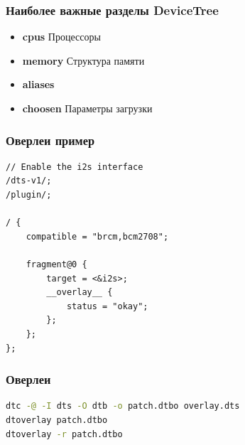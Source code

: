 \begin{frame}
  \frametitle{Наиболее важные разделы DeviceTree}
  \begin{itemize}
    \item \textbf{cpus} Процессоры
    \item \textbf{memory} Структура памяти
    \item \textbf{aliases}
    \item \textbf{choosen} Параметры загрузки
  \end{itemize}
\end{frame}

\begin{frame}[fragile]
  \frametitle{Оверлеи пример}
\begin{lstlisting}
// Enable the i2s interface
/dts-v1/;
/plugin/;

/ {
    compatible = "brcm,bcm2708";

    fragment@0 {
        target = <&i2s>;
        __overlay__ {
            status = "okay";
        };
    };
};
\end{lstlisting}
\end{frame}
\begin{frame}[fragile]
 \frametitle{Оверлеи}
\begin{lstlisting}[language=bash]
dtc -@ -I dts -O dtb -o patch.dtbo overlay.dts
dtoverlay patch.dtbo
dtoverlay -r patch.dtbo
\end{lstlisting}
\end{frame}

